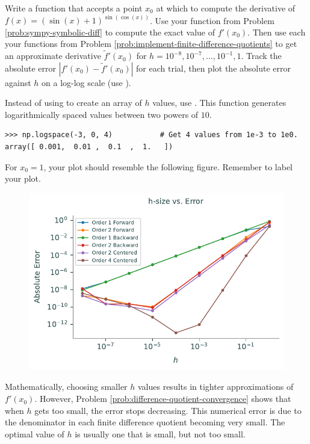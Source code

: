 \begin{problem} %
Write a function that accepts a point $x_0$ at which to compute the derivative of $f(x) = (\sin(x)+1)^{\sin(\cos(x))}$.
Use your function from Problem \ref{prob:sympy-symbolic-diff} to compute the exact value of $f'(x_0)$.
Then use each your functions from Problem \ref{prob:implement-finite-difference-quotients} to get an approximate derivative $\tilde{f}'(x_0)$ for $h=10^{-8},10^{-7},\ldots,10^{-1},1$.
Track the absolute error $|f'(x_0) - \tilde{f}'(x_0)|$ for each trial, then plot the absolute error against $h$ on a log-log scale (use ).

Instead of using  to create an array of $h$ values, use .
This function generates logarithmically spaced values between two powers of $10$.
\begin{lstlisting}
>>> np.logspace(-3, 0, 4)           # Get 4 values from 1e-3 to 1e0.
array([ 0.001,  0.01 ,  0.1  ,  1.   ])
\end{lstlisting}

For $x_0 = 1$, your plot should resemble the following figure. Remember to label your plot.
\begin{figure}[H]
    \centering
    \includegraphics[width=.65\textwidth]{figures/error_plot.pdf}
\end{figure}
\label{prob:difference-quotient-convergence}
\end{problem}

\begin{warn}
Mathematically, choosing smaller $h$ values results in tighter approximations of $f'(x_0)$.
However, Problem \ref{prob:difference-quotient-convergence} shows that when $h$ gets too small, the error stops decreasing.
This numerical error is due to the denominator in each finite difference quotient becoming very small.
The optimal value of $h$ is usually one that is small, but not too small.
\end{warn}

